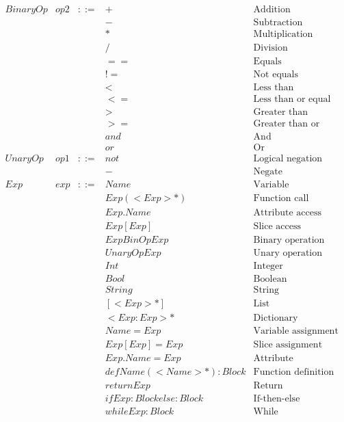 \documentclass[acmsmall,review,authorversion]{acmart}
\begin{document}
\[\begin{array}{lrcll}
BinaryOp & op2 & ::= & + & \text{Addition}
\\
&&& - & \text{Subtraction}
\\
&&& * & \text{Multiplication}
\\
&&& / & \text{Division}
\\
&&& == & \text{Equals}
\\
&&& != & \text{Not equals}
\\
&&& < & \text{Less than}
\\
&&& <= & \text{Less than or equal to}
\\
&&& > & \text{Greater than}
\\
&&& >= & \text{Greater than or equal to}
\\
&&& and & \text{And}
\\
&&& or & \text{Or}
\\
UnaryOp & op1 & ::= & not & \text{Logical negation}
\\ 
&&& - & \text{Negate}
\\
Exp & exp & ::= & Name & \text{Variable}
\\
&&& Exp(<Exp>*) & \text{Function call}
\\
&&& Exp.Name & \text{Attribute access}
\\
&&& Exp[Exp] & \text{Slice access}
\\
&&& Exp BinOp Exp & \text{Binary operation}
\\
&&& UnaryOp Exp & \text{Unary operation}
\\
&&& Int & \text{Integer}
\\
&&& Bool & \text{Boolean}
\\
&&& String & \text{String}
\\
&&& [<Exp>*] & \text{List}
\\
&&& {<Exp:Exp>*} & \text{Dictionary}
\\
&&& Name = Exp & \text{Variable assignment}
\\
&&& Exp[Exp] = Exp & \text{Slice assignment}
\\
&&& Exp.Name = Exp & \text{Attribute assignment}
\\
&&& def Name(<Name>*) : Block & \text{Function definition}
\\
&&& return Exp & \text{Return}
\\
&&& if Exp: Block else: Block & \text{If-then-else}
\\
&&& while Exp: Block & \text{While}
\\
\end{array}\]
\end{document}
